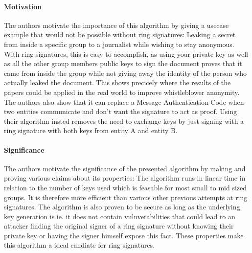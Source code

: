 \documentclass{scrartcl}
\begin{document}
\paragraph{Motivation}{
The authors motivate the importance of this algorithm by giving a usecase example that would not be possible without ring signatures: Leaking a secret from inside a specific group to a journalist while wishing to stay anonymous. With ring signatures, this is easy to accomplish, as using your private key as well as all the other group members public keys to sign the document proves that it came from inside the group while not giving away the identity of the person who actually leaked the document. This shows precicely where the results of the papers could be applied in the real world to improve whistleblower anonymity. The authors also show that it can replace a Message Authentication Code when two entities communicate and don't want the signature to act as proof. Using their algorithm insted removes the need to exchange keys by just signing with a ring signature with both keys from entity A and entity B.
}
\paragraph{Significance}{
The authors motivate the significance of the presented algorithm by making and proving various claims about its properties:
The algorithm runs in linear time in relation to the number of keys used which is feasable for most small to mid sized groups. It is therefore more efficient than various other previous attempts at ring signatures.
The algorithm is also proven to be secure as long as the underlying key generation is ie. it does not contain vulnverabilities that could lead to an attacker finding the original signer of a ring signature without knowing their private key or having the signer himself expose this fact.
These properties make this algorithm a ideal candiate for ring signatures.
}
\end{document}
